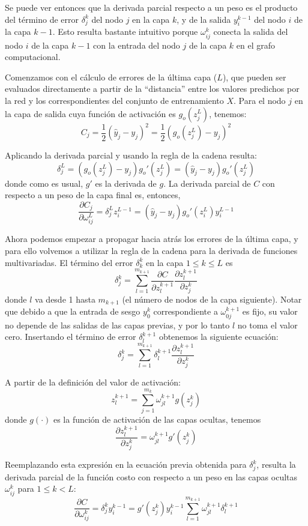 Se puede ver entonces que la derivada parcial respecto a un peso es el producto del término de error $\delta_j^k$ del nodo $j$ en la capa $k$, y de la salida $y_i^{k-1}$ del nodo $i$ de la capa $k-1$. Esto resulta bastante intuitivo porque $\omega_{ij}^k$ conecta la salida del nodo $i$ de la capa $k-1$ con la entrada del nodo $j$ de la capa $k$ en el grafo computacional.

Comenzamos con el cálculo de errores de la última capa ($L$), que pueden ser evaluados directamente a partir de la ``distancia'' entre los valores predichos por la red y los correspondientes del conjunto de entrenamiento $X$. Para el nodo $j$ en la capa de salida cuya función de activación es $g_o(z_j^L)$, tenemos:
\[ C_j = \frac{1}{2}(\hat{y}_j - y_j)^2 = \frac{1}{2} \left(g_o(z_j^L) - y_j\right)^2 \]

Aplicando la derivada parcial y usando la regla de la cadena resulta:
\[ \delta_j^L = (g_o(z_j^L) - y_j) g_o'(z_j^L) = (\hat{y}_j - y_j) g_o'(z_j^L) \]
donde como es usual, $g'$ es la derivada de $g$. La derivada parcial de $C$ con respecto a un peso de la capa final es, entonces,
\[ \frac{\partial C_j}{\partial \omega_{ij}^L} = \delta_j^L z_i^{L-1} = (\hat{y}_j - y_j) g_o'(z_i^L) y_i^{L-1} \]

Ahora podemos empezar a propagar hacia atrás los errores de la última capa, y para ello volvemos a utilizar la regla de la cadena para la derivada de funciones multivariadas. El término del error $\delta_k^k$ en la capa $1 \leq k \leq L$ es 
\[ \delta_j^k = \sum_{l = 1}^{m_{k+1}} \frac{\partial C}{\partial z_l^{k+1}} \frac{\partial z_l^{k+1}}{\partial z_j^k} \]
donde $l$ va desde 1 hasta $m_{k+1}$ (el número de nodos de la capa siguiente). Notar que debido a que la entrada de sesgo $y_0^k$ correspondiente a $\omega_{0j}^{k+1}$ es fijo, su valor no depende de las salidas de las capas previas, y por lo tanto $l$ no toma el valor cero. Insertando el término de error $\delta_l^{k+1}$ obtenemos la siguiente ecuación:
\[ \delta_j^k = \sum_{l=1}^{m_{k+1}} \delta_l^{k+1} \frac{ \partial z_l^{k+1}}{\partial z_j^k} \]

A partir de la definición del valor de activación:
\[ z_l^{k+1} = \sum_{j=1}^{m_k} \omega_{jl}^{k+1} g(z_j^k) \]
donde $g(\cdot)$ es la función de activación de las capas ocultas, tenemos
\[ \frac{\partial z_l^{k+1}}{\partial z_j^k} = \omega_{jl}^{k+1} g'(z_j^k) \]

Reemplazando esta expresión en la ecuación previa obtenida para $\delta_j^k$, resulta la derivada parcial de la función costo con respecto a un peso en las capas ocultas $\omega_{ij}^k$ para $1 \leq k < L$:
\[ \frac{\partial C}{\partial \omega_{ij}^k} = \delta_j^k y_i^{k-1} = g'(z_j^k) y_i^{k-1} \sum_{l=1}^{m_{k+1}} \omega_{jl}^{k+1} \delta_l^{k+1} \] 

